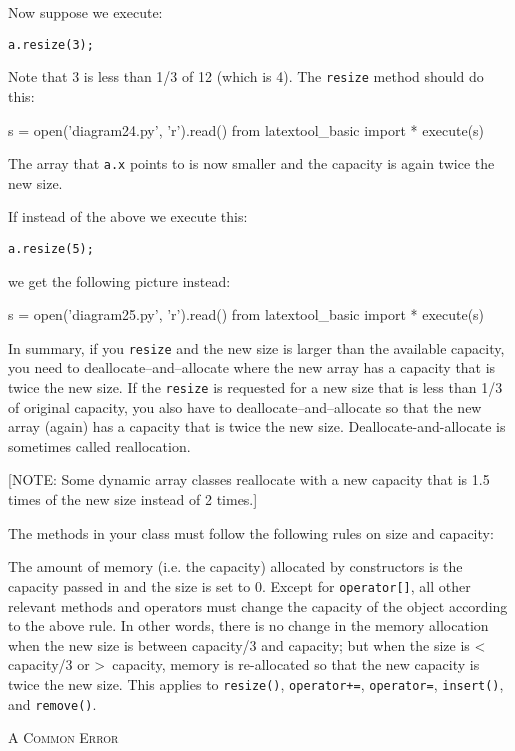 Now suppose we execute:
\begin{Verbatim}[frame=single]
a.resize(3);
\end{Verbatim}
Note that 3 is less than 1/3 of 12 (which is 4).
The \verb!resize! method should do this:
\begin{python}
s = open('diagram24.py', 'r').read()
from latextool_basic import *
execute(s)
\end{python}
The array that \verb!a.x! points to
is now smaller and the capacity is again
twice the new size.

If instead of the above we execute this:
\begin{Verbatim}[frame=single]
a.resize(5);
\end{Verbatim}
we get the following picture instead:
\begin{python}
s = open('diagram25.py', 'r').read()
from latextool_basic import *
execute(s)
\end{python}

In summary, if you \verb!resize! and the new size is
larger than the available capacity, you need to
deallocate--and--allocate where the new array
has a capacity that is twice the new size.
If the \verb!resize! is requested for a new size that is
less than 1/3 of original capacity,
you also have to deallocate--and--allocate
so that the new array (again) has a capacity
that is twice the new size.
Deallocate-and-allocate is sometimes called reallocation.

[NOTE:
Some dynamic array classes
reallocate with a new capacity that is
1.5 times of the new size instead of 2 times.]


The methods in your class must follow the following rules on size and capacity:
\begin{tightlist}
  \li The amount of memory (i.e. the capacity) allocated by constructors
  is the capacity passed in and the size is set to 0.
\li Except for \verb!operator[]!, all other relevant methods and operators 
must change the capacity of the object according to the above rule. In 
other words, there is no change in the memory allocation when the 
new size is between capacity/3 and capacity; but when the size is \textless
\, capacity/3 or \textgreater \, capacity, memory is re-allocated so that the new capacity 
is twice the new size. This applies to \verb!resize()!, \verb!operator+=!, 
\verb!operator=!, \verb!insert()!, and \verb!remove()!.
\end{tightlist}

\newpage
\textsc{A Common Error}

